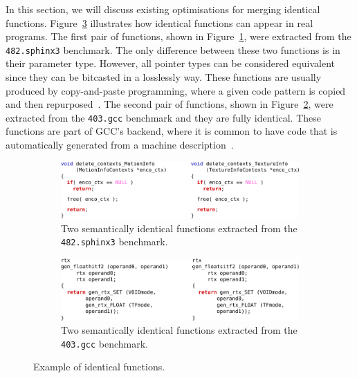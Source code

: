 In this section, we will discuss existing optimisations for merging identical functions.
Figure~\ref{fig:example-identical} illustrates how identical functions can appear in real programs.
The first pair of functions, shown in Figure~\ref{fig:example-identical-1-sphinx3}, were extracted from the \texttt{482.sphinx3} benchmark.
The only difference between these two functions is in their parameter type.
However, all pointer types can be considered equivalent since they can be bitcasted in a losslessly way.
These functions are usually produced by copy-and-paste programming, where a given code pattern is copied and then repurposed~\cite{kim04,jablonski10,ahmed15}.
The second pair of functions, shown in Figure~\ref{fig:example-identical-2-gcc}, were extracted from the \texttt{403.gcc} benchmark and they are fully identical.
These functions are part of GCC's backend, where it is common to have code that is automatically generated from a machine description~\cite{muchnick98,kolek13,ghica15}.

\begin{figure}[h]
\centering
\begin{subfigure}{\textwidth}
\centering
\includegraphics[scale=0.9]{src/relatedwork/figs/example-identical-1-sphinx3}
\caption{Two semantically identical functions extracted from the \texttt{482.sphinx3} benchmark.}
\label{fig:example-identical-1-sphinx3}
\end{subfigure}
\begin{subfigure}{\textwidth}
\centering
\includegraphics[scale=0.9]{src/relatedwork/figs/example-identical-2-gcc}
\caption{Two semantically identical functions extracted from the \texttt{403.gcc} benchmark.}
\label{fig:example-identical-2-gcc}
\end{subfigure}
\caption{Example of identical functions.}
\label{fig:example-identical}
\end{figure}

